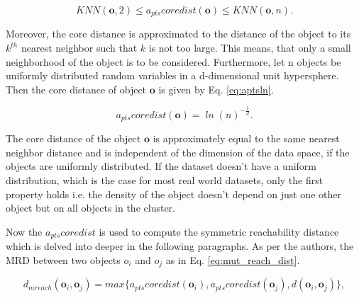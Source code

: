 \begin{equation}
  \label{eq:knndist}
  \mathit{KNN(\textbf{o},2)} \leq \mathit{a_{pts}coredist(\textbf{o})} \leq \mathit{KNN(\textbf{o},n)}.
\end{equation}

Moreover, the core distance is approximated to the distance of the object to its $k^{th}$ nearest neighbor such that $k$ is not too large. This means, that only a small neighborhood of the object is to be considered. Furthermore, let n objects be uniformly distributed random variables in a d-dimensional unit hypersphere. Then the core distance of object $\textbf{o}$ is given by Eq. \ref{eq:aptsln}.\cite{moulavi2014density}

\begin{equation}
  \label{eq:aptsln}
  \mathit{a_{pts}coredist(\textbf{o})} = \mathit{\ln(n)^{-\frac{1}{d}}}.
\end{equation}

The core distance of the object $\textbf{o}$ is approximately equal to the same nearest neighbor distance and is independent of the dimension of the data space, if the objects are uniformly distributed. If the dataset doesn't have a uniform distribution, which is the case for most real world datasets, only the first property holds i.e. the density of the object doesn't depend on just one other object but on all objects in the cluster.\cite{moulavi2014density}

\vspace{5 mm}

Now the $a_{pts}coredist$ is used to compute the symmetric reachability distance which is delved into deeper in the following paragraphs. As per the authors, the \ac{MRD} between two objects $o_i$ and $o_j$ as in Eq. \ref{eq:mut_reach_dist}.

\begin{equation}
  \label{eq:mut_reach_dist}
  \mathit{d_{mreach}(\textbf{o}_i, \textbf{o}_j)} = \mathit{max\{a_{pts}coredist(\textbf{o}_i), a_{pts}coredist(\textbf{o}_j), d(\textbf{o}_i, \textbf{o}_j)\}},
\end{equation}

